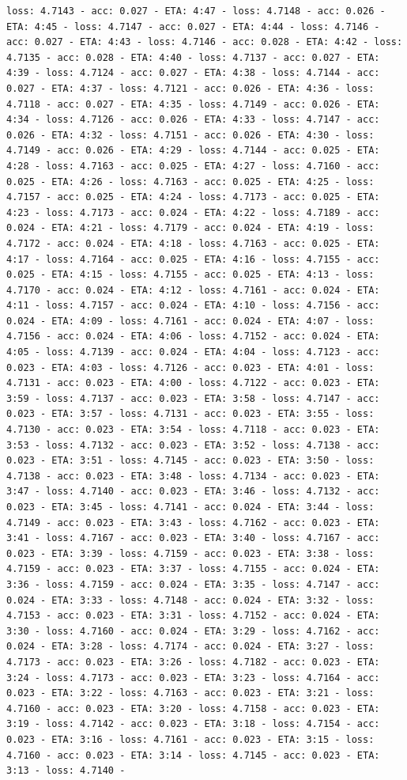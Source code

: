 \documentclass[11pt]{article}
\begin{document}
\begin{Verbatim}[commandchars=\\\{\}]
loss: 4.7143 - acc: 0.027 - ETA: 4:47 - loss: 4.7148 - acc: 0.026 - ETA: 4:45 - loss: 4.7147 - acc: 0.027 - ETA: 4:44 - loss: 4.7146 - acc: 0.027 - ETA: 4:43 - loss: 4.7146 - acc: 0.028 - ETA: 4:42 - loss: 4.7135 - acc: 0.028 - ETA: 4:40 - loss: 4.7137 - acc: 0.027 - ETA: 4:39 - loss: 4.7124 - acc: 0.027 - ETA: 4:38 - loss: 4.7144 - acc: 0.027 - ETA: 4:37 - loss: 4.7121 - acc: 0.026 - ETA: 4:36 - loss: 4.7118 - acc: 0.027 - ETA: 4:35 - loss: 4.7149 - acc: 0.026 - ETA: 4:34 - loss: 4.7126 - acc: 0.026 - ETA: 4:33 - loss: 4.7147 - acc: 0.026 - ETA: 4:32 - loss: 4.7151 - acc: 0.026 - ETA: 4:30 - loss: 4.7149 - acc: 0.026 - ETA: 4:29 - loss: 4.7144 - acc: 0.025 - ETA: 4:28 - loss: 4.7163 - acc: 0.025 - ETA: 4:27 - loss: 4.7160 - acc: 0.025 - ETA: 4:26 - loss: 4.7163 - acc: 0.025 - ETA: 4:25 - loss: 4.7157 - acc: 0.025 - ETA: 4:24 - loss: 4.7173 - acc: 0.025 - ETA: 4:23 - loss: 4.7173 - acc: 0.024 - ETA: 4:22 - loss: 4.7189 - acc: 0.024 - ETA: 4:21 - loss: 4.7179 - acc: 0.024 - ETA: 4:19 - loss: 4.7172 - acc: 0.024 - ETA: 4:18 - loss: 4.7163 - acc: 0.025 - ETA: 4:17 - loss: 4.7164 - acc: 0.025 - ETA: 4:16 - loss: 4.7155 - acc: 0.025 - ETA: 4:15 - loss: 4.7155 - acc: 0.025 - ETA: 4:13 - loss: 4.7170 - acc: 0.024 - ETA: 4:12 - loss: 4.7161 - acc: 0.024 - ETA: 4:11 - loss: 4.7157 - acc: 0.024 - ETA: 4:10 - loss: 4.7156 - acc: 0.024 - ETA: 4:09 - loss: 4.7161 - acc: 0.024 - ETA: 4:07 - loss: 4.7156 - acc: 0.024 - ETA: 4:06 - loss: 4.7152 - acc: 0.024 - ETA: 4:05 - loss: 4.7139 - acc: 0.024 - ETA: 4:04 - loss: 4.7123 - acc: 0.023 - ETA: 4:03 - loss: 4.7126 - acc: 0.023 - ETA: 4:01 - loss: 4.7131 - acc: 0.023 - ETA: 4:00 - loss: 4.7122 - acc: 0.023 - ETA: 3:59 - loss: 4.7137 - acc: 0.023 - ETA: 3:58 - loss: 4.7147 - acc: 0.023 - ETA: 3:57 - loss: 4.7131 - acc: 0.023 - ETA: 3:55 - loss: 4.7130 - acc: 0.023 - ETA: 3:54 - loss: 4.7118 - acc: 0.023 - ETA: 3:53 - loss: 4.7132 - acc: 0.023 - ETA: 3:52 - loss: 4.7138 - acc: 0.023 - ETA: 3:51 - loss: 4.7145 - acc: 0.023 - ETA: 3:50 - loss: 4.7138 - acc: 0.023 - ETA: 3:48 - loss: 4.7134 - acc: 0.023 - ETA: 3:47 - loss: 4.7140 - acc: 0.023 - ETA: 3:46 - loss: 4.7132 - acc: 0.023 - ETA: 3:45 - loss: 4.7141 - acc: 0.024 - ETA: 3:44 - loss: 4.7149 - acc: 0.023 - ETA: 3:43 - loss: 4.7162 - acc: 0.023 - ETA: 3:41 - loss: 4.7167 - acc: 0.023 - ETA: 3:40 - loss: 4.7167 - acc: 0.023 - ETA: 3:39 - loss: 4.7159 - acc: 0.023 - ETA: 3:38 - loss: 4.7159 - acc: 0.023 - ETA: 3:37 - loss: 4.7155 - acc: 0.024 - ETA: 3:36 - loss: 4.7159 - acc: 0.024 - ETA: 3:35 - loss: 4.7147 - acc: 0.024 - ETA: 3:33 - loss: 4.7148 - acc: 0.024 - ETA: 3:32 - loss: 4.7153 - acc: 0.023 - ETA: 3:31 - loss: 4.7152 - acc: 0.024 - ETA: 3:30 - loss: 4.7160 - acc: 0.024 - ETA: 3:29 - loss: 4.7162 - acc: 0.024 - ETA: 3:28 - loss: 4.7174 - acc: 0.024 - ETA: 3:27 - loss: 4.7173 - acc: 0.023 - ETA: 3:26 - loss: 4.7182 - acc: 0.023 - ETA: 3:24 - loss: 4.7173 - acc: 0.023 - ETA: 3:23 - loss: 4.7164 - acc: 0.023 - ETA: 3:22 - loss: 4.7163 - acc: 0.023 - ETA: 3:21 - loss: 4.7160 - acc: 0.023 - ETA: 3:20 - loss: 4.7158 - acc: 0.023 - ETA: 3:19 - loss: 4.7142 - acc: 0.023 - ETA: 3:18 - loss: 4.7154 - acc: 0.023 - ETA: 3:16 - loss: 4.7161 - acc: 0.023 - ETA: 3:15 - loss: 4.7160 - acc: 0.023 - ETA: 3:14 - loss: 4.7145 - acc: 0.023 - ETA: 3:13 - loss: 4.7140 - 
\end{Verbatim}
\end{document}
